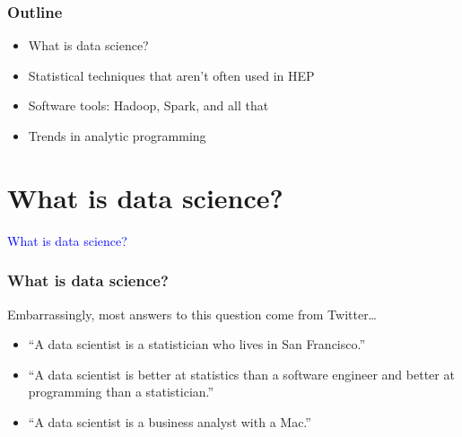 \documentclass[compress]{beamer}
\begin{document}
\begin{frame}
\frametitle{Outline}
\begin{itemize}\setlength{\itemsep}{0.75 cm}
\item What is data science?
\item Statistical techniques that aren't often used in HEP
\item Software tools: Hadoop, Spark, and all that
\item Trends in analytic programming
\end{itemize}
\end{frame}

\section*{What is data science?}
\begin{frame}
\begin{center}
\Huge \textcolor{blue}{What is data science?}
\end{center}
\end{frame}

\begin{frame}
\frametitle{What is data science?}
\vspace{0.5 cm}
Embarrassingly, most answers to this question come from Twitter\ldots
\begin{itemize}
\item ``A data scientist is a statistician who lives in San Francisco.''
\item ``A data scientist is better at statistics than a software engineer and better at programming than a statistician.''
\item ``A data scientist is a business analyst with a Mac.''
\end{itemize}

\vspace{0.2 cm}
\begin{center}

\vspace{0.5 cm}
\end{center}
\end{frame}
\end{document}

